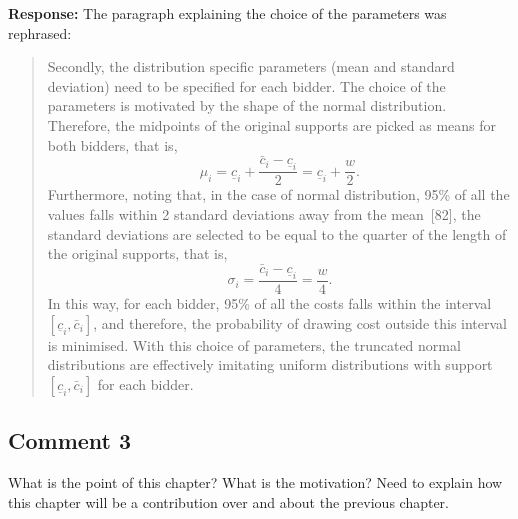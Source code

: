 \documentclass[10pt,a4paper,notitlepage]{article}
\numberwithin{equation}{section}
\begin{document}
\textbf{Response:}
The paragraph explaining the choice of the parameters was rephrased:
\begin{quote}
Secondly, the distribution specific parameters (mean and standard deviation) need to be specified for each bidder. The choice of the parameters is motivated by the shape of the normal distribution. Therefore, the midpoints of the original supports are picked as means for both bidders, that is,
\begin{equation}
\mu_i = \underline{c}_i + \frac{\bar{c}_i - \underline{c}_i}{2} = \underline{c}_i + \frac{w}{2}.
\end{equation}
Furthermore, noting that, in the case of normal distribution, 95\% of all the values falls within 2 standard deviations away from the mean~[82], the standard deviations are selected to be equal to the quarter of the length of the original supports, that is,
\begin{equation}
\sigma_i = \frac{\bar{c}_i - \underline{c}_i}{4} = \frac{w}{4}.
\end{equation}
In this way, for each bidder, 95\% of all the costs falls within the interval $[\underline{c}_i, \bar{c}_i]$, and therefore, the probability of drawing cost outside this interval is minimised. With this choice of parameters, the truncated normal distributions are effectively imitating uniform distributions with support $[\underline{c}_i, \bar{c}_i]$ for each bidder.
\end{quote}

\subsection{Comment 3}
What is the point of this chapter? What is the motivation? Need to explain how this chapter will be a contribution over and about the previous chapter.
\end{document}
